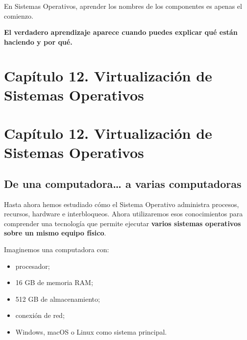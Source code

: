 \documentclass[
  spanish,
  letterpaper,
]{scrbook}
\providecommand{\tightlist}{%
  \setlength{\itemsep}{0pt}\setlength{\parskip}{0pt}}
\begin{document}
\begin{tcolorbox}[enhanced jigsaw, arc=.35mm, bottomrule=.15mm, bottomtitle=1mm, breakable, colback=white, colbacktitle=quarto-callout-tip-color!10!white, colframe=quarto-callout-tip-color-frame, coltitle=black, left=2mm, leftrule=.75mm, opacityback=0, opacitybacktitle=0.6, rightrule=.15mm, title=\textcolor{quarto-callout-tip-color}{\faLightbulb}\hspace{0.5em}{Consejo del Ingeniero}, titlerule=0mm, toprule=.15mm, toptitle=1mm]

En Sistemas Operativos, aprender los nombres de los componentes es
apenas el comienzo.

\textbf{El verdadero aprendizaje aparece cuando puedes explicar qué
están haciendo y por qué.}

\end{tcolorbox}


\chapter{Capítulo 12. Virtualización de Sistemas
Operativos}\label{capuxedtulo-12.-virtualizaciuxf3n-de-sistemas-operativos}


\chapter{Capítulo 12. Virtualización de Sistemas
Operativos}\label{capuxedtulo-12.-virtualizaciuxf3n-de-sistemas-operativos-1}

\section{De una computadora\ldots{} a varias
computadoras}\label{de-una-computadora-a-varias-computadoras}

Hasta ahora hemos estudiado cómo el Sistema Operativo administra
procesos, recursos, hardware e interbloqueos. Ahora utilizaremos esos
conocimientos para comprender una tecnología que permite ejecutar
\textbf{varios sistemas operativos sobre un mismo equipo físico}.

Imaginemos una computadora con:

\begin{itemize}
\tightlist
\item
  procesador;
\item
  16 GB de memoria RAM;
\item
  512 GB de almacenamiento;
\item
  conexión de red;
\item
  Windows, macOS o Linux como sistema principal.
\end{itemize}
\end{document}
